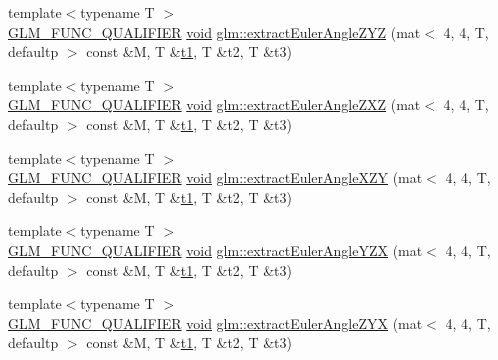 \begin{DoxyCompactItemize}
\item 
{\footnotesize template$<$typename T $>$ }\\\mbox{\hyperlink{setup_8hpp_a33fdea6f91c5f834105f7415e2a64407}{G\+L\+M\+\_\+\+F\+U\+N\+C\+\_\+\+Q\+U\+A\+L\+I\+F\+I\+ER}} \mbox{\hyperlink{_s_d_l__opengles2__gl2ext_8h_ae5d8fa23ad07c48bb609509eae494c95}{void}} \mbox{\hyperlink{group__gtx__euler__angles_gafdfa880a64b565223550c2d3938b1aeb}{glm\+::extract\+Euler\+Angle\+Z\+YZ}} (mat$<$ 4, 4, T, defaultp $>$ const \&M, T \&\mbox{\hyperlink{_s_d_l__opengl__glext_8h_af48031a37b713afa3b0d0d7d29653d7c}{t1}}, T \&t2, T \&t3)
\item 
{\footnotesize template$<$typename T $>$ }\\\mbox{\hyperlink{setup_8hpp_a33fdea6f91c5f834105f7415e2a64407}{G\+L\+M\+\_\+\+F\+U\+N\+C\+\_\+\+Q\+U\+A\+L\+I\+F\+I\+ER}} \mbox{\hyperlink{_s_d_l__opengles2__gl2ext_8h_ae5d8fa23ad07c48bb609509eae494c95}{void}} \mbox{\hyperlink{group__gtx__euler__angles_ga59359fef9bad92afaca55e193f91e702}{glm\+::extract\+Euler\+Angle\+Z\+XZ}} (mat$<$ 4, 4, T, defaultp $>$ const \&M, T \&\mbox{\hyperlink{_s_d_l__opengl__glext_8h_af48031a37b713afa3b0d0d7d29653d7c}{t1}}, T \&t2, T \&t3)
\item 
{\footnotesize template$<$typename T $>$ }\\\mbox{\hyperlink{setup_8hpp_a33fdea6f91c5f834105f7415e2a64407}{G\+L\+M\+\_\+\+F\+U\+N\+C\+\_\+\+Q\+U\+A\+L\+I\+F\+I\+ER}} \mbox{\hyperlink{_s_d_l__opengles2__gl2ext_8h_ae5d8fa23ad07c48bb609509eae494c95}{void}} \mbox{\hyperlink{group__gtx__euler__angles_gabe5a65d8eb1cd873c8de121cce1a15ed}{glm\+::extract\+Euler\+Angle\+X\+ZY}} (mat$<$ 4, 4, T, defaultp $>$ const \&M, T \&\mbox{\hyperlink{_s_d_l__opengl__glext_8h_af48031a37b713afa3b0d0d7d29653d7c}{t1}}, T \&t2, T \&t3)
\item 
{\footnotesize template$<$typename T $>$ }\\\mbox{\hyperlink{setup_8hpp_a33fdea6f91c5f834105f7415e2a64407}{G\+L\+M\+\_\+\+F\+U\+N\+C\+\_\+\+Q\+U\+A\+L\+I\+F\+I\+ER}} \mbox{\hyperlink{_s_d_l__opengles2__gl2ext_8h_ae5d8fa23ad07c48bb609509eae494c95}{void}} \mbox{\hyperlink{group__gtx__euler__angles_ga9049b78466796c0de2971756e25b93d3}{glm\+::extract\+Euler\+Angle\+Y\+ZX}} (mat$<$ 4, 4, T, defaultp $>$ const \&M, T \&\mbox{\hyperlink{_s_d_l__opengl__glext_8h_af48031a37b713afa3b0d0d7d29653d7c}{t1}}, T \&t2, T \&t3)
\item 
{\footnotesize template$<$typename T $>$ }\\\mbox{\hyperlink{setup_8hpp_a33fdea6f91c5f834105f7415e2a64407}{G\+L\+M\+\_\+\+F\+U\+N\+C\+\_\+\+Q\+U\+A\+L\+I\+F\+I\+ER}} \mbox{\hyperlink{_s_d_l__opengles2__gl2ext_8h_ae5d8fa23ad07c48bb609509eae494c95}{void}} \mbox{\hyperlink{group__gtx__euler__angles_ga2d6c11a4abfa60c565483cee2d3f7665}{glm\+::extract\+Euler\+Angle\+Z\+YX}} (mat$<$ 4, 4, T, defaultp $>$ const \&M, T \&\mbox{\hyperlink{_s_d_l__opengl__glext_8h_af48031a37b713afa3b0d0d7d29653d7c}{t1}}, T \&t2, T \&t3)

\end{DoxyCompactItemize}
